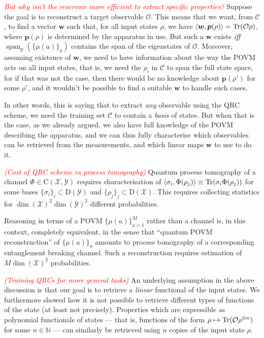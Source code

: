 \documentclass[12pt]{report}
\newcommand{\NN}{\mathbb{N}}
\newcommand{\RR}{\mathbb{R}}
\newcommand{\on}[1]{\operatorname{#1}}
\newcommand{\bs}[1]{\boldsymbol{#1}}
\newcommand{\calC}{{\mathcal{C}}}
\newcommand{\calY}{{\mathcal{Y}}}
\newcommand{\calO}{{\mathcal{O}}}
\newcommand{\calX}{{\mathcal{X}}}
\newcommand{\rmC}{{\mathrm{C}}}
\newcommand{\rmD}{{\mathrm{D}}}
\begin{document}
\textcolor{red}{\emph{But why isn't the reservoir more efficient to extract specific properties?}}
Suppose the goal is to reconstruct a target observable $\calO$.
This means that we want, from $\calC$, to find a vector $\bs w$ such that, for all input states $\rho$, we have
$\langle \bs w, \bs p(\rho)\rangle = \Tr(\calO\rho)$,
where $\bs p(\rho)$ is determined by the apparatus in use.
But such a $\bs w$ exists \emph{iff} $\on{span}_\RR(\{\mu(a)\}_a)$ contains the span of the eigenstates of $\calO$.
Moreover, assuming existence of $\bs w$, we need to have information about the way the POVM acts on all input states, that is, we need the $\rho_i$ in $\calC$ to span the full state space, for if that was not the case, then there would be no knowledge about $\bs p(\rho')$ for some $\rho'$, and it wouldn't be possible to find a suitable $\bs w$ to handle such cases.

In other words, this is saying that to extract \emph{any} observable using the QRC scheme, we need the training set $\calC$ to contain a \emph{basis} of states. But when that is the case, as we already argued, we also have full knowledge of the POVM describing the apparatus, and we can thus fully characterise which observables can be retrieved from the measurements, and which linear maps $\bs w$ to use to do it.

\textcolor{red}{\emph{(Cost of QRC scheme vs process tomography)}}
Quantum process tomography of a channel $\Phi\in\rmC(\calX,\calY)$ requires characterisation of $\langle\sigma_i,\Phi(\rho_j)\rangle\equiv\Tr(\sigma_i\Phi(\rho_j))$ for some bases $\{\sigma_i\}_i\subset\rmD(\calY)$ and $\{\rho_j\}_j\subset\rmD(\calX)$.
This requires collecting statistics for $\dim(\calX)^2\dim(\calY)^2$ different probabilities.

Reasoning in terms of a POVM $\{\mu(a)\}_{a=1}^M$ rather than a channel is, in this context, completely equivalent, in the sense that ``quantum POVM reconstruction'' of $\{\mu(a)\}_a$ amounts to process tomography of a corresponding entanglement breaking channel.
Such a reconstruction requires estimation of $M\dim(\calX)^2$ probabilities.

\textcolor{red}{\emph{(Training QRCs for more general tasks)}}
An underlying assumption in the above discussion is that our goal is to retrieve a \emph{linear} functional of the input states.
We furthermore showed how it is not possible to retrieve different types of functions of the state (at least not precisely).
Properties which are expressible as polynomial functionals of states --- that is, functions of the form $\rho\mapsto \Tr(\calO\rho^{\otimes n})$ for some $n\in\NN$ --- can similarly be retrieved using $n$ copies of the input state $\rho$.
\end{document}
